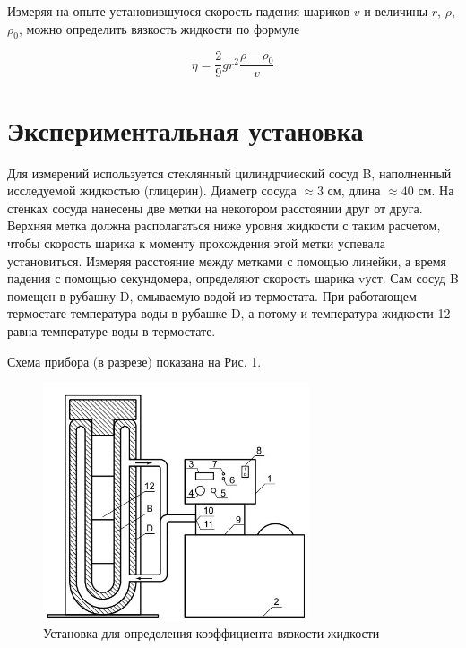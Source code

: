 \documentclass[a4paper,12pt]{article} %
\begin{document}
\noindent Измеряя на опыте установившуюся скорость падения шариков $v$ и величины $r$, $\rho$, $\rho_0$, можно определить вязкость жидкости по формуле

	\begin{equation}
		\label{formula}
		\eta = \frac{2}{9} g r^2 \frac{\rho - \rho_0}{v}
	\end{equation}
	
\section{Экспериментальная установка}
	
\noindent Для измерений используется стеклянный цилиндрчиеский сосуд B, наполненный исследуемой жидкостью (глицерин). Диаметр сосуда $\approx 3$ см, длина $\approx 40$ см. На стенках сосуда нанесены две метки на некотором расстоянии друг от друга. Верхняя метка должна располагаться ниже уровня жидкости с таким расчетом, чтобы скорость шарика к моменту прохождения этой метки успевала установиться. Измеряя расстояние между метками с помощью линейки, а время падения с помощью секундомера, определяют скорость шарика vуст. Сам сосуд B помещен в рубашку D, омываемую водой из термостата. При работающем термостате температура воды в рубашке D, а потому и температура жидкости 12 равна температуре воды в термостате.
	
\medskip	
	
\noindent Схема прибора (в разрезе) показана на Рис. 1.

\begin{figure}[h!]
	\begin{center}
	\includegraphics[width = 0.7\textwidth]{установка.jpg}
	\end{center}
	\caption{Установка для определения коэффициента вязкости жидкости}
\end{figure}
\end{document}

